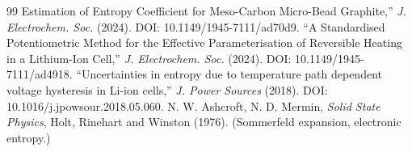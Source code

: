 \documentclass[11pt,a4paper]{article}
\begin{document}
\begin{thebibliography}{99}
  Estimation of Entropy Coefficient for Meso-Carbon Micro-Bead Graphite,''
  \emph{J. Electrochem. Soc.} (2024). DOI: 10.1149/1945-7111/ad70d9.
  ``A Standardised Potentiometric Method for the Effective Parameterisation
  of Reversible Heating in a Lithium-Ion Cell,''
  \emph{J. Electrochem. Soc.} (2024). DOI: 10.1149/1945-7111/ad4918.
  ``Uncertainties in entropy due to temperature path dependent voltage
  hysteresis in Li-ion cells,''
  \emph{J. Power Sources} (2018). DOI: 10.1016/j.jpowsour.2018.05.060.
 N. W. Ashcroft, N. D. Mermin,
  \emph{Solid State Physics}, Holt, Rinehart and Winston (1976).
  (Sommerfeld expansion, electronic entropy.)
\end{thebibliography}
\end{document}
